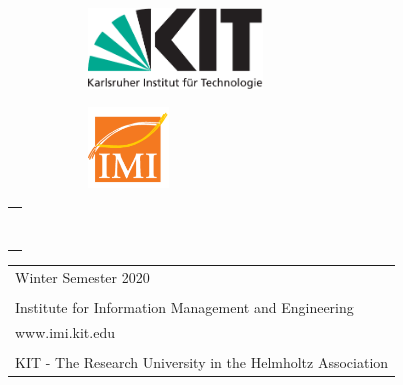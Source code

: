 \begin{titlepage}
\thispagestyle{empty}
\enlargethispage{2cm}

\sffamily
\vspace*{-3.2cm}
\hspace*{-0.6cm}
\begin{figure}
    \begin{subfigure}[b]{0.3\textwidth}
         \centering
         \includegraphics[height=2.14cm]{figures/kit-logo}
     \end{subfigure}
     \begin{subfigure}[b]{0.3\textwidth}
         \centering
         \includegraphics[height=2.14cm]{git_manual/figures/imi.pdf}
     \end{subfigure}
\end{figure}

\begin{addmargin}{2cm}

\vfill

\begin{tabular}{>{\RaggedRight}p{12cm}}
	{\textbf{\huge Git Manual: The Subject-Oriented Approach}}\\
	\\
	\\
	{Author: Anh Kha Nguyen }  \\
	{Semester: 7. Bachelor Semester } \\
	{Supervisor: Dr.-Ing. Dipl.-Wi.-Ing. Matthes Elstermann} \vspace{2em} \\
	\\
	{\LARGE }
\end{tabular}
\vfill
\vfill
\vfill



\vspace{1em}
\begin{tabular}{ll}
	

	Winter Semester 2020 \\
	\\
	\multicolumn{2}{l}{Institute for Information Management and Engineering} \\
	\multicolumn{2}{l}{www.imi.kit.edu} \\
	\\
	\multicolumn{2}{l}{\scriptsize{KIT - The Research University in the Helmholtz Association}}\\
\end{tabular}

\end{addmargin}
\newpage
\thispagestyle{empty}
\end{titlepage}